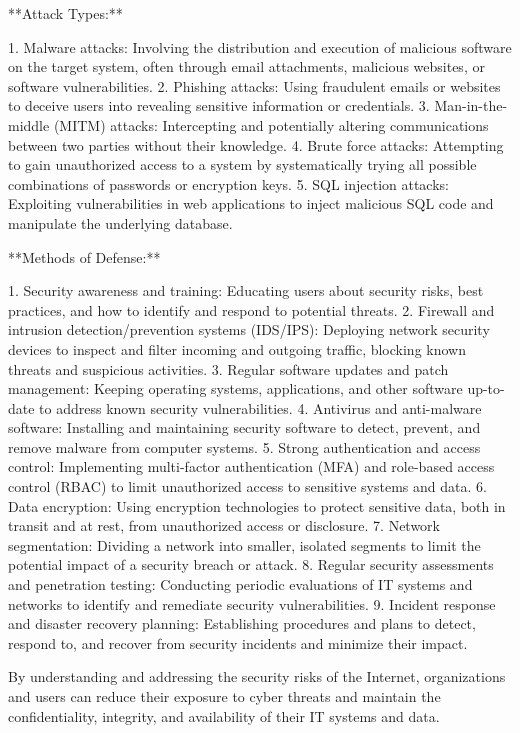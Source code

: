 \documentclass{article}
\begin{document}
**Attack Types:**

1. Malware attacks: Involving the distribution and execution of malicious software on the target system, often through email attachments, malicious websites, or software vulnerabilities.
2. Phishing attacks: Using fraudulent emails or websites to deceive users into revealing sensitive information or credentials.
3. Man-in-the-middle (MITM) attacks: Intercepting and potentially altering communications between two parties without their knowledge.
4. Brute force attacks: Attempting to gain unauthorized access to a system by systematically trying all possible combinations of passwords or encryption keys.
5. SQL injection attacks: Exploiting vulnerabilities in web applications to inject malicious SQL code and manipulate the underlying database.

**Methods of Defense:**

1. Security awareness and training: Educating users about security risks, best practices, and how to identify and respond to potential threats.
2. Firewall and intrusion detection/prevention systems (IDS/IPS): Deploying network security devices to inspect and filter incoming and outgoing traffic, blocking known threats and suspicious activities.
3. Regular software updates and patch management: Keeping operating systems, applications, and other software up-to-date to address known security vulnerabilities.
4. Antivirus and anti-malware software: Installing and maintaining security software to detect, prevent, and remove malware from computer systems.
5. Strong authentication and access control: Implementing multi-factor authentication (MFA) and role-based access control (RBAC) to limit unauthorized access to sensitive systems and data.
6. Data encryption: Using encryption technologies to protect sensitive data, both in transit and at rest, from unauthorized access or disclosure.
7. Network segmentation: Dividing a network into smaller, isolated segments to limit the potential impact of a security breach or attack.
8. Regular security assessments and penetration testing: Conducting periodic evaluations of IT systems and networks to identify and remediate security vulnerabilities.
9. Incident response and disaster recovery planning: Establishing procedures and plans to detect, respond to, and recover from security incidents and minimize their impact.

By understanding and addressing the security risks of the Internet, organizations and users can reduce their exposure to cyber threats and maintain the confidentiality, integrity, and availability of their IT systems and data.
\end{document}
